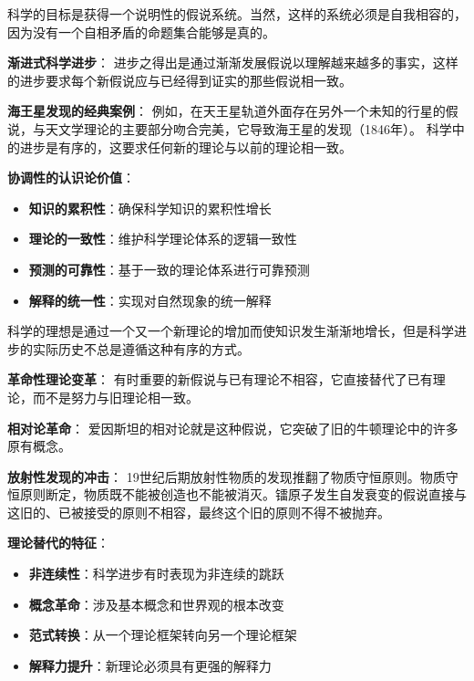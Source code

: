 \begin{theorembox}[title=协调性标准的理论基础]
科学的目标是获得一个说明性的假说系统。当然，这样的系统必须是自我相容的，因为没有一个自相矛盾的命题集合能够是真的。

\textbf{渐进式科学进步}：
进步之得出是通过渐渐发展假说以理解越来越多的事实，这样的进步要求每个新假说应与已经得到证实的那些假说相一致。

\textbf{海王星发现的经典案例}：
例如，在天王星轨道外面存在另外一个未知的行星的假说，与天文学理论的主要部分吻合完美，它导致海王星的发现（1846年）。\cite{kuhn1957} 科学中的进步是有序的，这要求任何新的理论与以前的理论相一致。

\textbf{协调性的认识论价值}：
\begin{itemize}
\item \textbf{知识的累积性}：确保科学知识的累积性增长
\item \textbf{理论的一致性}：维护科学理论体系的逻辑一致性
\item \textbf{预测的可靠性}：基于一致的理论体系进行可靠预测
\item \textbf{解释的统一性}：实现对自然现象的统一解释
\end{itemize}
\end{theorembox}

\begin{theorembox}[title=科学革命与理论替代的复杂性]
科学的理想是通过一个又一个新理论的增加而使知识发生渐渐地增长，但是科学进步的实际历史不总是遵循这种有序的方式。

\textbf{革命性理论变革}：
有时重要的新假说与已有理论不相容，它直接替代了已有理论，而不是努力与旧理论相一致。

\textbf{相对论革命}：
爱因斯坦的相对论就是这种假说，它突破了旧的牛顿理论中的许多原有概念。

\textbf{放射性发现的冲击}：
19世纪后期放射性物质的发现推翻了物质守恒原则。物质守恒原则断定，物质既不能被创造也不能被消灭。镭原子发生自发衰变的假说直接与这旧的、已被接受的原则不相容，最终这个旧的原则不得不被抛弃。

\textbf{理论替代的特征}：
\begin{itemize}
\item \textbf{非连续性}：科学进步有时表现为非连续的跳跃
\item \textbf{概念革命}：涉及基本概念和世界观的根本改变
\item \textbf{范式转换}：从一个理论框架转向另一个理论框架
\item \textbf{解释力提升}：新理论必须具有更强的解释力
\end{itemize}
\end{theorembox}

